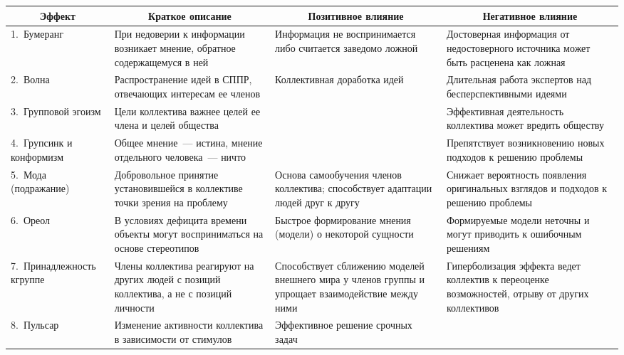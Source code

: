 \begin{multicols}{2}
\begin{table*}[b]\small
\vspace*{-9pt}
\begin{center}
\vspace*{2ex}

\begin{tabular}{|p{19mm}|p{40mm}|p{44mm}|p{46mm}|}
\hline

\multicolumn{1}{|c|}{Эффект}&\multicolumn{1}{c|}{Краткое описание}&\multicolumn{1}{c|}{Позитивное 
влияние}&\multicolumn{1}{c|}{Негативное влияние}\\
\hline
1.~Бумеранг&При недоверии к информации возникает мнение, обратное содержащемуся в ней&Информация не 
воспринимается либо считается заведомо ложной&Достоверная информация от недостоверного источника 
может быть расценена как ложная\\
\hline
2.~Волна&Распространение идей в СППР, отвечающих интересам ее членов&Коллективная доработка идей 
&Длительная работа экспертов над бесперспективными идеями\\
\hline
3.~Групповой эгоизм&Цели коллектива важнее целей ее члена и целей общества& &Эффективная деятельность 
коллектива может вредить обществу\\
\hline
4.~Групсинк и конформизм&Общее мнение~--- истина, мнение отдельного человека~--- ничто& &Препятствует 
возникновению новых подходов к решению проб\-ле\-мы\\
\hline
5.~Мода (подражание)&Добровольное принятие установившейся в коллективе точки зрения на проб\-ле\-му&Основа 
самообучения членов коллектива; способствует адап\-та\-ции людей друг к другу&Снижает вероятность 
появления оригинальных взглядов и подходов к решению проб\-лемы\\
\hline
6.~Ореол&В условиях дефицита времени объекты могут восприниматься на основе стереотипов&Быстрое 
формирование мнения (модели) о некоторой сущности&Формируемые модели неточны и могут приводить к 
ошибочным решениям\\
\hline
7.~При\-над\-леж\-ность к\newline группе&Члены коллектива реагируют на других людей с позиций коллектива, а не с 
позиций личности&Способствует сближению моделей внешнего мира у членов группы и упрощает 
взаимодействие между ними&Гиперболизация эффекта ведет коллектив к переоценке возможностей, отрыву от 
других коллективов\\
\hline
8.~Пульсар&Изменение активности коллектива в зависимости от стимулов&Эффективное решение срочных задач 

\end{tabular}
\end{center}
\end{table*}
\end{multicols}

